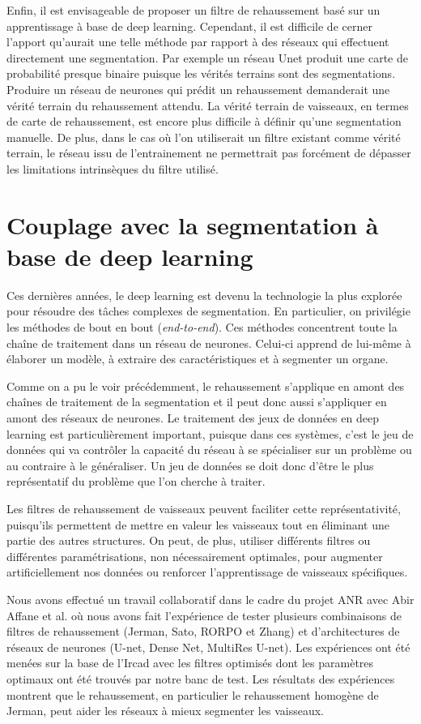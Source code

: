 Enfin, il est envisageable de proposer un filtre de rehaussement basé sur un apprentissage à base de deep learning. Cependant, il est difficile de cerner l'apport qu'aurait une telle méthode par rapport à des réseaux qui effectuent directement une segmentation. Par exemple un réseau Unet produit une carte de probabilité presque binaire puisque les vérités terrains sont des segmentations. Produire un réseau de neurones qui prédit un rehaussement demanderait une vérité terrain du rehaussement attendu. La vérité terrain de vaisseaux, en termes de carte de rehaussement, est encore plus difficile à définir qu'une segmentation manuelle. De plus, dans le cas où l'on utiliserait un filtre existant comme vérité terrain, le réseau issu de l'entrainement ne permettrait pas forcément de dépasser les limitations intrinsèques du filtre utilisé.
\section{Couplage avec la segmentation à base de deep learning}
Ces dernières années, le deep learning est devenu la technologie la plus explorée pour résoudre des tâches complexes de segmentation. En particulier,  on privilégie les méthodes de bout en bout (\textit{end-to-end}). Ces méthodes concentrent toute la chaîne de traitement dans un réseau de neurones. Celui-ci apprend de lui-même à élaborer un modèle, à extraire des caractéristiques et à segmenter un organe. 

Comme on a pu le voir précédemment, le rehaussement s'applique en amont des chaînes de traitement de la segmentation et il peut donc aussi s'appliquer en amont des réseaux de neurones. Le traitement des jeux de données en deep learning est particulièrement important, puisque dans ces systèmes, c'est le jeu de données qui va contrôler la capacité du réseau à se spécialiser sur un problème ou au contraire à le généraliser. Un jeu de données se doit donc d'être le plus représentatif du problème que l'on cherche à traiter.

Les filtres de rehaussement de vaisseaux peuvent faciliter cette représentativité, puisqu'ils permettent de mettre en valeur les vaisseaux tout en éliminant une partie des autres structures. On peut, de plus, utiliser différents filtres ou différentes paramétrisations, non nécessairement optimales, pour augmenter artificiellement nos données ou renforcer l'apprentissage de vaisseaux spécifiques.

Nous avons effectué un travail collaboratif \cite{Affane_2022_article_commun} dans le cadre du projet ANR avec Abir Affane et al. où nous avons fait l'expérience de tester plusieurs combinaisons de filtres de rehaussement (Jerman, Sato, RORPO et Zhang) et d'architectures de réseaux de neurones (U-net, Dense Net, MultiRes U-net). Les expériences ont été menées sur la base de l'Ircad avec les filtres optimisés dont les paramètres optimaux ont été trouvés par notre banc de test. Les résultats des expériences montrent que le rehaussement, en particulier le rehaussement homogène de Jerman, peut aider les réseaux à mieux segmenter les vaisseaux.


